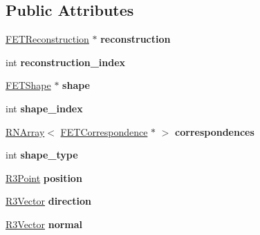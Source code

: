 \subsection*{Public Attributes}
\begin{DoxyCompactItemize}
\item 
\hyperlink{struct_f_e_t_reconstruction}{F\+E\+T\+Reconstruction} $\ast$ {\bfseries reconstruction}\hypertarget{struct_f_e_t_feature_acb7c9ee81ed8518128cf57f3d5bd0e20}{}\label{struct_f_e_t_feature_acb7c9ee81ed8518128cf57f3d5bd0e20}

\item 
int {\bfseries reconstruction\+\_\+index}\hypertarget{struct_f_e_t_feature_a8108de5343724268fa272033cf8bd04f}{}\label{struct_f_e_t_feature_a8108de5343724268fa272033cf8bd04f}

\item 
\hyperlink{struct_f_e_t_shape}{F\+E\+T\+Shape} $\ast$ {\bfseries shape}\hypertarget{struct_f_e_t_feature_a13f8d27fa144f26e2948adaa3ed98459}{}\label{struct_f_e_t_feature_a13f8d27fa144f26e2948adaa3ed98459}

\item 
int {\bfseries shape\+\_\+index}\hypertarget{struct_f_e_t_feature_a72752049bd4cc9cd429959787f0880a1}{}\label{struct_f_e_t_feature_a72752049bd4cc9cd429959787f0880a1}

\item 
\hyperlink{class_r_n_array}{R\+N\+Array}$<$ \hyperlink{struct_f_e_t_correspondence}{F\+E\+T\+Correspondence} $\ast$ $>$ {\bfseries correspondences}\hypertarget{struct_f_e_t_feature_a7b18eb7ded9ec07e93eb0f14bf353f62}{}\label{struct_f_e_t_feature_a7b18eb7ded9ec07e93eb0f14bf353f62}

\item 
int {\bfseries shape\+\_\+type}\hypertarget{struct_f_e_t_feature_a2c53c29718e5d9c77749f4c1eae82dbd}{}\label{struct_f_e_t_feature_a2c53c29718e5d9c77749f4c1eae82dbd}

\item 
\hyperlink{class_r3_point}{R3\+Point} {\bfseries position}\hypertarget{struct_f_e_t_feature_a91ec2d026420cd9390b40d2734270e4a}{}\label{struct_f_e_t_feature_a91ec2d026420cd9390b40d2734270e4a}

\item 
\hyperlink{class_r3_vector}{R3\+Vector} {\bfseries direction}\hypertarget{struct_f_e_t_feature_a0a23c41a6926f08e73fb7debdc282d90}{}\label{struct_f_e_t_feature_a0a23c41a6926f08e73fb7debdc282d90}

\item 
\hyperlink{class_r3_vector}{R3\+Vector} {\bfseries normal}\hypertarget{struct_f_e_t_feature_a3fbb653db1f1e01cbdc96058ca5de5e4}{}\label{struct_f_e_t_feature_a3fbb653db1f1e01cbdc96058ca5de5e4}


\end{DoxyCompactItemize}
